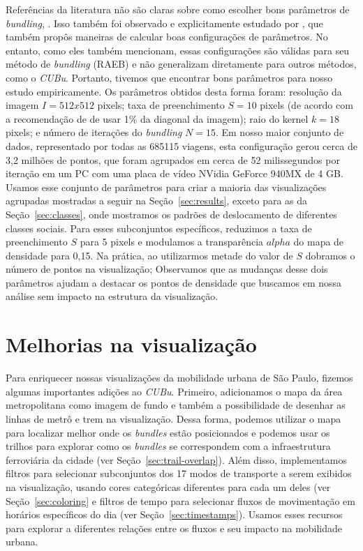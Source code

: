Referências da literatura não são claras sobre como escolher bons parâmetros de
\emph{bundling}, \cite{lhuillier:17}. Isso também foi observado e explicitamente
estudado por \cite{zeng:19}, que também propôs maneiras de calcular boas
configurações de parâmetros. No entanto, como eles também mencionam, essas
configurações são válidas para seu método de \emph{bundling} (RAEB) e não
generalizam diretamente para outros métodos, como o \emph{CUBu}. Portanto,
tivemos que encontrar bons parâmetros para nosso estudo empiricamente. Os
parâmetros obtidos desta forma foram: resolução da imagem $I = 512 x 512$
pixels; taxa de preenchimento $S = 10$ pixels (de acordo com a recomendação de
\cite{zwan:16} de usar 1\% da diagonal da imagem); raio do kernel $k = 18$
pixels; e número de iterações do \emph{bundling} $N = 15$. Em nosso maior
conjunto de dados, representado por todas as \num{685115} viagens, esta
configuração gerou cerca de 3,2 milhões de pontos, que foram agrupados em cerca
de 52 milissegundos por iteração em um PC com uma placa de vídeo NVidia GeForce
940MX de 4 GB. Usamos esse conjunto de parâmetros para criar a maioria das
visualizações agrupadas mostradas a seguir na Seção~\ref{sec:results}, exceto para as da Seção~\ref{sec:classes},
onde mostramos os padrões de deslocamento de diferentes classes sociais.
Para esses subconjuntos específicos, reduzimos a taxa de preenchimento $S$ para
5 pixels e modulamos a transparência $alpha$ do mapa de densidade para 0,15. Na
prática, ao utilizarmos metade do valor de $S$ dobramos o número de pontos na
visualização;  Observamos que as mudanças desse dois parâmetros ajudam a
destacar os pontos de densidade que buscamos em nossa análise sem impacto na
estrutura da visualização.


\section{Melhorias na visualização}

Para enriquecer nossas visualizações da mobilidade urbana de São Paulo, fizemos
algumas importantes adições ao \emph{CUBu}. Primeiro, adicionamos o mapa da área
metropolitana como imagem de fundo e também a possibilidade de desenhar as
linhas de metrô e trem na visualização. Dessa forma, podemos utilizar o mapa
para localizar melhor onde os \emph{bundles} estão posicionados e podemos usar
os trilhos para explorar como os \emph{bundles} se correspondem com a
infraestrutura ferroviária da cidade (ver Seção~\ref{sec:trail-overlap}). Além
disso, implementamos filtros para selecionar subconjuntos dos 17 modos de
transporte a serem exibidos na visualização, usando cores categóricas diferentes
para cada um deles (ver Seção~\ref{sec:coloring} e filtros de tempo para selecionar fluxos de movimentação em
horários específicos do dia (ver Seção~\ref{sec:timestamps}). Usamos esses recursos para explorar a diferentes
relações entre os fluxos e seu impacto na mobilidade urbana.
